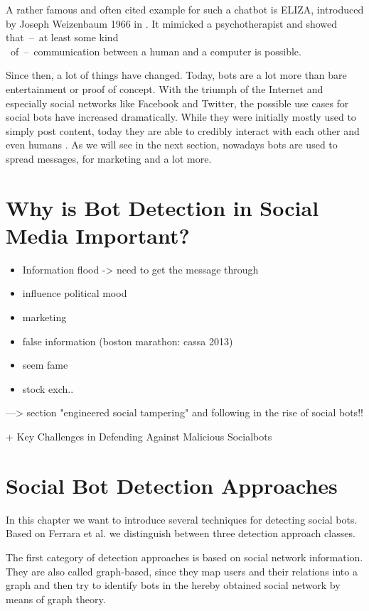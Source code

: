A rather famous and often cited example for such a chatbot is ELIZA, introduced by Joseph Weizenbaum 1966 in \cite{eliza}. It mimicked a psychotherapist and showed \mbox{that -- at} least some kind\\ \mbox{ of -- communication} between a human and a computer is possible.

Since then, a lot of things have changed. Today, bots are a lot more than bare entertainment or proof of concept. With the triumph of the Internet and especially social networks like Facebook and Twitter, the possible use cases for social bots have increased dramatically. While they were initially mostly used to simply post content, today they are able to credibly interact with each other and even humans \cite{boshmaf13, hwang12}. As we will see in the next section, nowadays bots are used to spread messages, for marketing and a lot more.


\section{Why is Bot Detection in Social Media Important?}
\begin{itemize}
	\item Information flood -> need to get the message through
	\item influence political mood
	\item marketing
	\item false information (boston marathon: cassa 2013)
	\item seem fame
	\item stock exch..
\end{itemize}
---> section "engineered social tampering" and following in the rise of social bots!! 

+ Key Challenges in Defending Against Malicious Socialbots \cite{boshmaf12}
\section{Social Bot Detection Approaches}
In this chapter we want to introduce several techniques for detecting social bots. Based on Ferrara et al. \cite{ferrara15} we distinguish between three detection approach classes. 

The first category of detection approaches is based on social network information. They are also called graph-based, since they map users and their relations into a graph and then try to identify bots in the hereby obtained social network by means of graph theory. 

